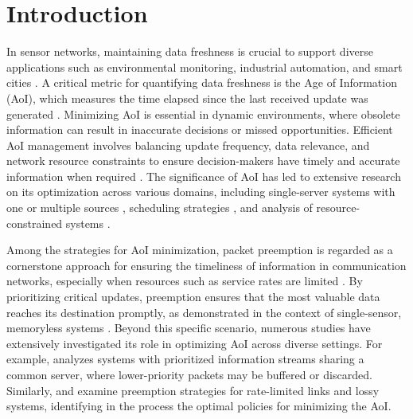 \section{Introduction}

In sensor networks, maintaining data freshness is crucial to support diverse applications such as environmental monitoring, industrial automation, and smart cities \cite{kandris2020applications}. A critical metric for quantifying data freshness is the Age of Information (AoI), which measures the time elapsed since the last received update was generated \cite{yates2012}. Minimizing AoI is essential in dynamic environments, where obsolete information can result in inaccurate decisions or missed opportunities. Efficient AoI management involves balancing update frequency, data relevance, and network resource constraints to ensure decision-makers have timely and accurate information when required \cite{yates2021age}. The significance of AoI has led to extensive research on its optimization across various domains, including single-server systems with one or multiple sources \cite{modiano2015,mm1,sun2016,najm2018,soysal2019,9137714,yates2019,zou2023costly}, scheduling strategies \cite{modiano-sch-1,9007478,sch-igor-1,9241401,sch-li,sch-sun}, and analysis of resource-constrained systems \cite{const-ulukus,const-biyikoglu,const-arafa,const-farazi,const-parisa}. 


Among the strategies for AoI minimization, packet preemption is regarded as a cornerstone approach for ensuring the timeliness of information in communication networks, especially when resources such as service rates are limited \cite{yates2021age}. By prioritizing critical updates, preemption ensures that the most valuable data reaches its destination promptly, as demonstrated in the context of single-sensor, memoryless systems \cite{kaul2012status,inoue2019general}. Beyond this specific scenario, numerous studies have extensively investigated its role in optimizing AoI across diverse settings. For example, \cite{maatouk2019age} analyzes systems with prioritized information streams sharing a common server, where lower-priority packets may be buffered or discarded. Similarly, \cite{wang2019preempt} and \cite{kavitha2021controlling} examine preemption strategies for rate-limited links and lossy systems, identifying in the process the optimal policies for minimizing the AoI.

